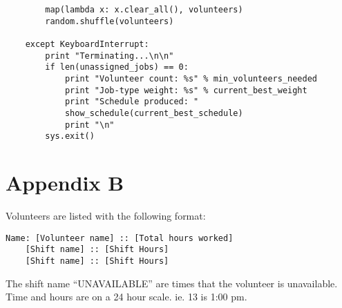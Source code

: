 \documentclass[11pt]{article}
\theoremstyle{definition}
\begin{document}
\begin{lstlisting}
        map(lambda x: x.clear_all(), volunteers)
        random.shuffle(volunteers)

    except KeyboardInterrupt:
        print "Terminating...\n\n"
        if len(unassigned_jobs) == 0:
            print "Volunteer count: %s" % min_volunteers_needed
            print "Job-type weight: %s" % current_best_weight
            print "Schedule produced: "
            show_schedule(current_best_schedule)
            print "\n"
        sys.exit()
\end{lstlisting}

\section{Appendix B}
Volunteers are listed with the following format:
\begin{lstlisting}
Name: [Volunteer name] :: [Total hours worked]
    [Shift name] :: [Shift Hours]
    [Shift name] :: [Shift Hours]
\end{lstlisting}
The shift name ``UNAVAILABLE'' are times that the volunteer is unavailable.
Time and hours are on a 24 hour scale. ie. 13 is 1:00 pm.
\end{document}
